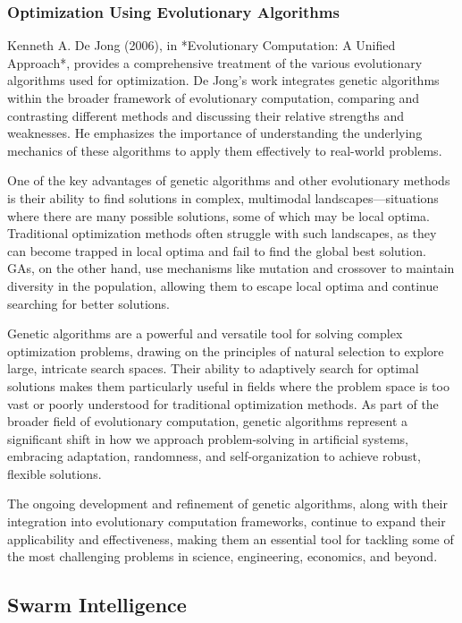 \documentclass[12pt,twoside]{article}
\begin{document}
\subsubsection{Optimization Using Evolutionary Algorithms}

Kenneth A. De Jong (2006), in *Evolutionary Computation: A Unified Approach*, provides a comprehensive treatment of the various evolutionary algorithms used for optimization. De Jong’s work integrates genetic algorithms within the broader framework of evolutionary computation, comparing and contrasting different methods and discussing their relative strengths and weaknesses. He emphasizes the importance of understanding the underlying mechanics of these algorithms to apply them effectively to real-world problems.

One of the key advantages of genetic algorithms and other evolutionary methods is their ability to find solutions in complex, multimodal landscapes—situations where there are many possible solutions, some of which may be local optima. Traditional optimization methods often struggle with such landscapes, as they can become trapped in local optima and fail to find the global best solution. GAs, on the other hand, use mechanisms like mutation and crossover to maintain diversity in the population, allowing them to escape local optima and continue searching for better solutions.

Genetic algorithms are a powerful and versatile tool for solving complex optimization problems, drawing on the principles of natural selection to explore large, intricate search spaces. Their ability to adaptively search for optimal solutions makes them particularly useful in fields where the problem space is too vast or poorly understood for traditional optimization methods. As part of the broader field of evolutionary computation, genetic algorithms represent a significant shift in how we approach problem-solving in artificial systems, embracing adaptation, randomness, and self-organization to achieve robust, flexible solutions.

The ongoing development and refinement of genetic algorithms, along with their integration into evolutionary computation frameworks, continue to expand their applicability and effectiveness, making them an essential tool for tackling some of the most challenging problems in science, engineering, economics, and beyond.

\subsection{Swarm Intelligence}
\end{document}
